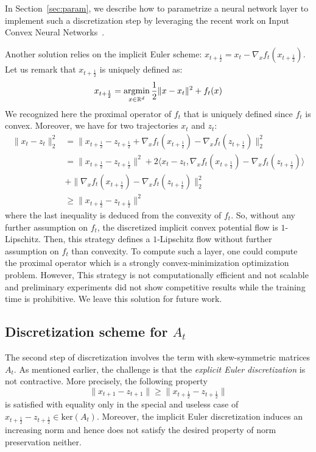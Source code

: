 In Section~\ref{sec:param}, we describe how to parametrize a neural network layer to implement such a discretization step by leveraging the recent work on Input Convex Neural Networks~\cite{amos2017input}. 

\begin{rmq}
Another solution relies on the implicit Euler scheme: $ x_{t+\frac12} = x_{t}-\nabla_xf_{t}(x_{t+\frac12})$. Let us remark that $x_{t+\frac12}$ is uniquely defined as:
\begin{align*}
 x_{t+\frac12} =\operatorname*{argmin}_{x\in\mathbb{R}^d} \frac 12\lVert x-x_t\rVert^2+ f_t(x)  
\end{align*}
We recognized here the proximal operator of $f_t$ that is uniquely defined since $f_t$ is convex. Moreover, we have for two trajectories $x_t$ and $z_t$:
\begin{align*}
   \lVert x_t-z_t\rVert^2_2& =  \lVert x_{t+\frac12}-z_{t+\frac12} +\nabla_xf_{t}(x_{t+\frac12})-\nabla_xf_{t}(z_{t+\frac12}) \rVert^2_2 \\
   &=  \lVert x_{t+\frac12}-z_{t+\frac12}\rVert^2 + 2\langle x_t-z_t,\nabla_xf_{t}(x_{t+\frac12})-\nabla_xf_{t}(z_{t+\frac12})\rangle \\
   &+\lVert\nabla_xf_{t}(x_{t+\frac12})-\nabla_xf_{t}(z_{t+\frac12}) \rVert^2_2 \\
   &\geq  \lVert x_{t+\frac12}-z_{t+\frac12}\rVert^2 
\end{align*}
where the last inequality is deduced from the convexity of $f_t$. So, without any further assumption on $f_t$, the discretized implicit convex potential flow is $1$-Lipschitz. Then, this strategy defines a $1$-Lipschitz flow without further assumption on $f_t$ than convexity. To compute such a layer, one could compute the proximal operator which is a  strongly convex-minimization optimization problem. However, This strategy is not computationally efficient and not scalable and preliminary experiments did not show competitive results while the training time is prohibitive. We leave this solution for future work. 

\end{rmq}
\subsection{Discretization scheme for $A_t$}

The second step of discretization involves the term with skew-symmetric matrices $A_t$. As mentioned earlier, the challenge is that the \emph{explicit Euler discretization} is not contractive. More precisely,  the following property 
$$\lVert x_{t+1} - z_{t+1}\rVert\geq \lVert x_{t+\frac12} - z_{t+\frac12}\rVert$$ 
is satisfied with equality only in the special and useless case of $x_{t+\frac12} - z_{t+\frac12} \in \text{ker}(A_t)$. Moreover, the implicit Euler discretization induces an increasing norm and hence does not satisfy the desired property of norm preservation neither. 

